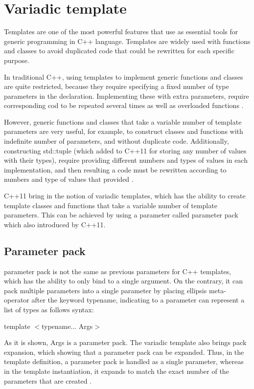 \documentclass[11pt]{report}
\begin{document}
\section{Variadic template}
\label{section: Variadic template}
Templates are one of the most powerful features that use as essential tools for generic programming in C++ language. Templates are widely used with functions and classes to avoid duplicated code that could be rewritten for each specific purpose.


In traditional C++, using templates to implement generic functions and classes are quite restricted, because they require specifying a fixed number of type parameters in the declaration. Implementing these with extra parameters, require corresponding cod to be repeated several times as well as overloaded functions \cite{Stroustrup:2012:Cpp11}.


However, generic functions and classes that take a variable number of template parameters are very useful, for example, to construct classes and functions with indefinite number of parameters, and without duplicate code. Additionally, constructing std::tuple (which added to C++11 for storing any number of values with their types), require providing different numbers and types of values in each implementation, and then resulting a code must be rewritten according to numbers and type of values that provided \cite{Stroustrup:2012:Cpp11}.


C++11 bring in the notion of variadic templates, which has the ability to create template classes and functions that take a variable number of template parameters. This can be achieved by using a parameter called parameter pack which also introduced by C++11.


\subsection{Parameter pack}
\label{subsection: Parameter pack}
parameter pack is not the same as previous parameters for C++ templates, which has the ability to only bind to a single argument. On the contrary, it can pack multiple parameters into a single parameter by placing ellipsis meta-operator after the keyword typename, indicating to a parameter can represent a list of types as follows syntax:
\begin{center}
template $<$typename... Args$>$
\end{center}

As it is shown, Args is a parameter pack. The variadic template also brings pack expansion, which showing that a parameter pack can be expanded. Thus, in the template definition, a parameter pack is handled as a single parameter, whereas in the template instantiation, it expands to match the exact number of the parameters that are created \cite{Gregorie:professionalcpp}.
\end{document}
